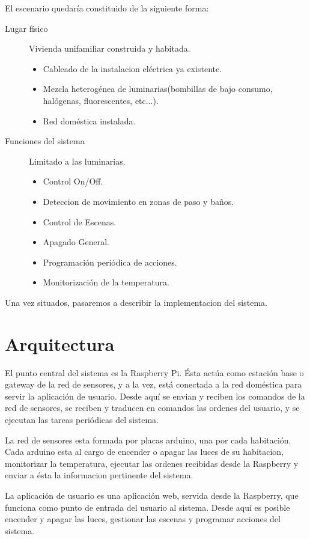 El escenario quedaría constituido de la siguiente forma:
\begin{description}
    \item[Lugar físico] Vivienda unifamiliar construida y habitada.
        \begin{itemize}
            \item Cableado de la instalacion eléctrica ya existente.
            \item Mezcla heterogénea de luminarias(bombillas de bajo consumo, halógenas, fluorescentes, etc...).
            \item Red doméstica instalada.
        \end{itemize}
    \item[Funciones del sistema] Limitado a las luminarias.
        \begin{itemize}
            \item Control On/Off.
            \item Deteccion de movimiento en zonas de paso y baños.
            \item Control de Escenas.
            \item Apagado General.
            \item Programación periódica de acciones.
            \item Monitorización de la temperatura.
        \end{itemize}
\end{description}

Una vez situados, pasaremos a describir la implementacion del sistema.


\section{Arquitectura}
El punto central del sistema es la Raspberry Pi. Ésta actúa como estación base o gateway de la red de sensores, y a la vez, está conectada a la red doméstica para servir la aplicación de usuario. Desde aquí se envian y reciben los comandos de la red de sensores, se reciben y traducen en comandos las ordenes del usuario, y se ejecutan las tareas periódicas del sistema. 


La red de sensores esta formada por placas arduino, una por cada habitación. Cada arduino esta al cargo de encender o apagar las luces de su habitacion, monitorizar la temperatura, ejecutar las ordenes recibidas desde la Raspberry y enviar a ésta la informacion pertinente del sistema.

La aplicación de usuario es una aplicación web, servida desde la Raspberry, que funciona como punto de entrada del usuario al sistema. Desde aquí es posible encender y apagar las luces, gestionar las escenas y programar acciones del sistema.

